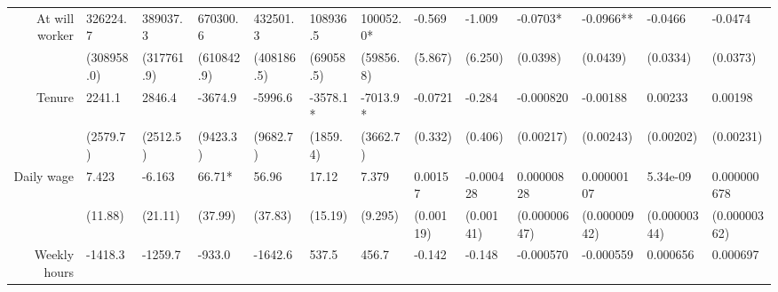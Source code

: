 \begin{tabular}{rrrrrrrrrrrrr}
At will worker & \multicolumn{1}{l}{326224.7} & \multicolumn{1}{l}{389037.3} & \multicolumn{1}{l}{670300.6} & \multicolumn{1}{l}{432501.3} & \multicolumn{1}{l}{108936.5} & \multicolumn{1}{l}{100052.0*} & \multicolumn{1}{l}{-0.569} & \multicolumn{1}{l}{-1.009} & \multicolumn{1}{l}{-0.0703*} & \multicolumn{1}{l}{-0.0966**} & \multicolumn{1}{l}{-0.0466} & \multicolumn{1}{l}{-0.0474} \\
      & \multicolumn{1}{l}{(308958.0)} & \multicolumn{1}{l}{(317761.9)} & \multicolumn{1}{l}{(610842.9)} & \multicolumn{1}{l}{(408186.5)} & \multicolumn{1}{l}{(69058.5)} & \multicolumn{1}{l}{(59856.8)} & \multicolumn{1}{l}{(5.867)} & \multicolumn{1}{l}{(6.250)} & \multicolumn{1}{l}{(0.0398)} & \multicolumn{1}{l}{(0.0439)} & \multicolumn{1}{l}{(0.0334)} & \multicolumn{1}{l}{(0.0373)} \\
Tenure & \multicolumn{1}{l}{2241.1} & \multicolumn{1}{l}{2846.4} & \multicolumn{1}{l}{-3674.9} & \multicolumn{1}{l}{-5996.6} & \multicolumn{1}{l}{-3578.1*} & \multicolumn{1}{l}{-7013.9*} & \multicolumn{1}{l}{-0.0721} & \multicolumn{1}{l}{-0.284} & \multicolumn{1}{l}{-0.000820} & \multicolumn{1}{l}{-0.00188} & \multicolumn{1}{l}{0.00233} & \multicolumn{1}{l}{0.00198} \\
      & \multicolumn{1}{l}{(2579.7)} & \multicolumn{1}{l}{(2512.5)} & \multicolumn{1}{l}{(9423.3)} & \multicolumn{1}{l}{(9682.7)} & \multicolumn{1}{l}{(1859.4)} & \multicolumn{1}{l}{(3662.7)} & \multicolumn{1}{l}{(0.332)} & \multicolumn{1}{l}{(0.406)} & \multicolumn{1}{l}{(0.00217)} & \multicolumn{1}{l}{(0.00243)} & \multicolumn{1}{l}{(0.00202)} & \multicolumn{1}{l}{(0.00231)} \\
Daily wage & \multicolumn{1}{l}{7.423} & \multicolumn{1}{l}{-6.163} & \multicolumn{1}{l}{66.71*} & \multicolumn{1}{l}{56.96} & \multicolumn{1}{l}{17.12} & \multicolumn{1}{l}{7.379} & \multicolumn{1}{l}{0.00157} & \multicolumn{1}{l}{-0.000428} & \multicolumn{1}{l}{0.00000828} & \multicolumn{1}{l}{0.00000107} & \multicolumn{1}{l}{5.34e-09} & \multicolumn{1}{l}{0.000000678} \\
      & \multicolumn{1}{l}{(11.88)} & \multicolumn{1}{l}{(21.11)} & \multicolumn{1}{l}{(37.99)} & \multicolumn{1}{l}{(37.83)} & \multicolumn{1}{l}{(15.19)} & \multicolumn{1}{l}{(9.295)} & \multicolumn{1}{l}{(0.00119)} & \multicolumn{1}{l}{(0.00141)} & \multicolumn{1}{l}{(0.00000647)} & \multicolumn{1}{l}{(0.00000942)} & \multicolumn{1}{l}{(0.00000344)} & \multicolumn{1}{l}{(0.00000362)} \\
Weekly hours & \multicolumn{1}{l}{-1418.3} & \multicolumn{1}{l}{-1259.7} & \multicolumn{1}{l}{-933.0} & \multicolumn{1}{l}{-1642.6} & \multicolumn{1}{l}{537.5} & \multicolumn{1}{l}{456.7} & \multicolumn{1}{l}{-0.142} & \multicolumn{1}{l}{-0.148} & \multicolumn{1}{l}{-0.000570} & \multicolumn{1}{l}{-0.000559} & \multicolumn{1}{l}{0.000656} & \multicolumn{1}{l}{0.000697} \\

\end{tabular}
